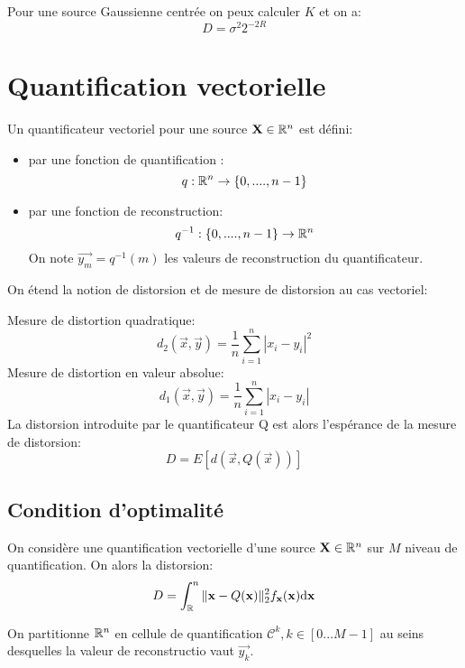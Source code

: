 \documentclass[main.tex]{subfiles}
\begin{document}
\begin{rem}
  Pour une source Gaussienne centrée on peux calculer $K$ et on a:
  \[
    D = \sigma^2 2^{-2R}
  \]
\end{rem}


\section{Quantification vectorielle}
\begin{defin}
  Un quantificateur vectoriel pour une source $\mathbf{X}\in\mathbb{R}^n$ est défini:

  \begin{itemize}
  \item par une fonction de quantification :
\[
  q : \mathbb{R}^n \to \{0, .... ,n-1\}
\]
\item par une fonction de reconstruction:
  \[
    q^{-1} :  \{0, .... ,n-1\} \to \mathbb{R}^n
  \]
  On note $\vec{y_m} = q^{-1}(m)$ les valeurs de reconstruction du quantificateur.
\end{itemize}
\end{defin}

On étend la notion de distorsion et de mesure de distorsion au cas vectoriel:

\begin{prop}

  Mesure de distortion quadratique:\\
  \[
    d_2(\vec{x},\vec{y}) = \frac{1}{n}\sum_{i=1}^{n}|x_i-y_i|^2
  \]
  Mesure de distortion en valeur absolue:
  \[
    d_1(\vec{x},\vec{y})  = \frac{1}{n}\sum_{i=1}^{n}|x_i-y_i|
  \]
  La distorsion introduite par le quantificateur Q est alors l'espérance de la mesure de distorsion:
  \[
    D = E[d(\vec{x},Q(\vec{x}))]
  \]
\end{prop}

\subsection{Condition d'optimalité}

On considère une quantification vectorielle d'une source $\mathbf{X}\in\mathbb{R}^n$ sur $M$ niveau de quantification. On alors la distorsion:
\[
  D = \int_{\mathbb{R}}^n \|\mathbf{x}-Q(\mathbf{x})\|^2_2 f_{\mathbf{x}}(\mathbf{x})\mbox{d} \mathbf{x}
\]

On partitionne $\mathbb{R}^n$ en cellule de quantification $\mathcal{C}^k, k\in[0...M-1]$ au seins desquelles  la valeur de reconstructio vaut $\vec{y_k}$.
\end{document}
